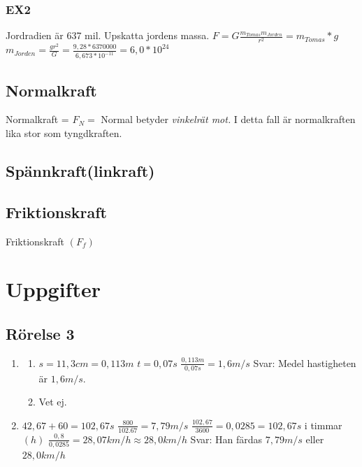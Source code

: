 \documentclass[a4paper,11pt]{article}
\begin{document}
\begin{flushleft}
\subsubsection{EX2}
Jordradien är 637 mil. Upskatta jordens massa.\newline
$ F=G\frac{m_{Tomas} m_{Jorden}}{r^2}=m_{Tomas}*g $\newline
$ m_{Jorden}=\frac{gr^2}{G}=\frac{9,28*6370000}{6,673*10^{-11}}=6,0*10^{24} $
\subsection{Normalkraft}
Normalkraft = $F_N=$\newline
Normal betyder \textit{vinkelrät mot.}\newline
I detta fall är normalkraften lika stor som tyngdkraften.
\subsection{Spännkraft(linkraft)}
\subsection{Friktionskraft}
Friktionskraft $( F_f )$\newline
\newpage
\section{Uppgifter}
\subsection{Rörelse 3}
\begin{enumerate}
  \item \begin{enumerate}
    \item $ s=11,3cm=0,113m $\newline
    $ t=0,07s $\newline
    $ \frac{0,113m}{0,07s}=1,6m/s $\newline
    Svar: Medel hastigheten är $ 1,6m/s $.
    \item Vet ej.
  \end{enumerate}
  \item $ 42,67+60=102,67s $\newline
  $ \frac{800}{102.67}=7,79m/s $\newline
  \newline
  $ \frac{102,67}{3600}=0,0285 = 102,67s $ i timmar$(h)$\newline
  \newline
  $ \frac{0,8}{0,0285}=28,07km/h\approx28,0km/h $\newline
  \newline
  Svar: Han färdas $ 7,79m/s $ eller $ 28,0km/h $  
  

\end{enumerate}
\end{flushleft}
\end{document}
